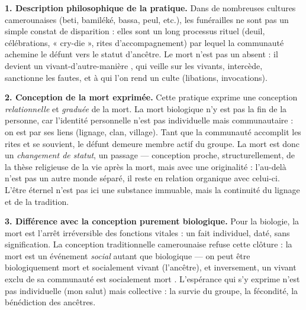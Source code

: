 \documentclass[11pt]{article}
\newcommand{\cle}[1]{{\popxbold\color{popdark}#1}}
\begin{document}
\begin{corrige}
\textbf{1. Description philosophique de la pratique.} Dans de nombreuses cultures camerounaises (beti, bamiléké, bassa, peul, etc.), les funérailles ne sont pas un simple constat de disparition : elles sont un long processus rituel (deuil, célébrations, « cry-die », rites d'accompagnement) par lequel la communauté achemine le défunt vers le statut d'\cle{ancêtre}. Le mort n'est pas un absent : il devient un \guillemotleft vivant-d'autre-manière \guillemotright, qui veille sur les vivants, intercède, sanctionne les fautes, et à qui l'on rend un culte (libations, invocations).

\textbf{2. Conception de la mort exprimée.} Cette pratique exprime une conception \emph{relationnelle} et \emph{graduée} de la mort. La mort biologique n'y est pas la fin de la personne, car l'identité personnelle n'est pas individuelle mais communautaire : on est par ses liens (lignage, clan, village). Tant que la communauté accomplit les rites et se souvient, le défunt demeure membre actif du groupe. La mort est donc un \emph{changement de statut}, un passage — conception proche, structurellement, de la thèse religieuse de la vie après la mort, mais avec une originalité : l'au-delà n'est pas un autre monde séparé, il reste en relation organique avec celui-ci. L'\cle{être éternel} n'est pas ici une substance immuable, mais la continuité du lignage et de la tradition.

\textbf{3. Différence avec la conception purement biologique.} Pour la biologie, la mort est l'arrêt irréversible des fonctions vitales : un fait individuel, daté, sans signification. La conception traditionnelle camerounaise refuse cette clôture : la mort est un événement \emph{social} autant que biologique — on peut être biologiquement mort et socialement vivant (l'ancêtre), et inversement, un vivant exclu de sa communauté est socialement \guillemotleft mort \guillemotright. L'\cle{espérance} qui s'y exprime n'est pas individuelle (mon salut) mais collective : la survie du groupe, la fécondité, la bénédiction des ancêtres.


\end{corrige}
\end{document}
